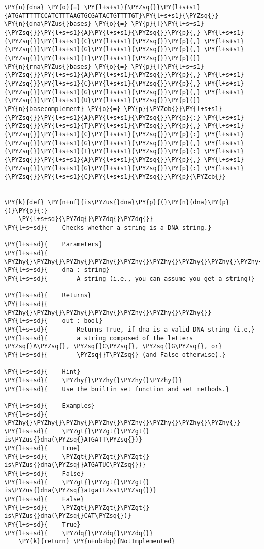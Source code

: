 \begin{Verbatim}[commandchars=\\\{\}]
\PY{n}{dna} \PY{o}{=} \PY{l+s+s1}{\PYZsq{}}\PY{l+s+s1}{ATGATTTTTCCATCTTTAAGTGCGATACTGTTTTGT}\PY{l+s+s1}{\PYZsq{}}
\PY{n}{dna\PYZus{}bases} \PY{o}{=} \PY{p}{[}\PY{l+s+s1}{\PYZsq{}}\PY{l+s+s1}{A}\PY{l+s+s1}{\PYZsq{}}\PY{p}{,} \PY{l+s+s1}{\PYZsq{}}\PY{l+s+s1}{C}\PY{l+s+s1}{\PYZsq{}}\PY{p}{,} \PY{l+s+s1}{\PYZsq{}}\PY{l+s+s1}{G}\PY{l+s+s1}{\PYZsq{}}\PY{p}{,} \PY{l+s+s1}{\PYZsq{}}\PY{l+s+s1}{T}\PY{l+s+s1}{\PYZsq{}}\PY{p}{]}
\PY{n}{rna\PYZus{}bases} \PY{o}{=} \PY{p}{[}\PY{l+s+s1}{\PYZsq{}}\PY{l+s+s1}{A}\PY{l+s+s1}{\PYZsq{}}\PY{p}{,} \PY{l+s+s1}{\PYZsq{}}\PY{l+s+s1}{C}\PY{l+s+s1}{\PYZsq{}}\PY{p}{,} \PY{l+s+s1}{\PYZsq{}}\PY{l+s+s1}{G}\PY{l+s+s1}{\PYZsq{}}\PY{p}{,} \PY{l+s+s1}{\PYZsq{}}\PY{l+s+s1}{U}\PY{l+s+s1}{\PYZsq{}}\PY{p}{]}
\PY{n}{basecomplement} \PY{o}{=} \PY{p}{\PYZob{}}\PY{l+s+s1}{\PYZsq{}}\PY{l+s+s1}{A}\PY{l+s+s1}{\PYZsq{}}\PY{p}{:} \PY{l+s+s1}{\PYZsq{}}\PY{l+s+s1}{T}\PY{l+s+s1}{\PYZsq{}}\PY{p}{,} \PY{l+s+s1}{\PYZsq{}}\PY{l+s+s1}{C}\PY{l+s+s1}{\PYZsq{}}\PY{p}{:} \PY{l+s+s1}{\PYZsq{}}\PY{l+s+s1}{G}\PY{l+s+s1}{\PYZsq{}}\PY{p}{,} \PY{l+s+s1}{\PYZsq{}}\PY{l+s+s1}{T}\PY{l+s+s1}{\PYZsq{}}\PY{p}{:} \PY{l+s+s1}{\PYZsq{}}\PY{l+s+s1}{A}\PY{l+s+s1}{\PYZsq{}}\PY{p}{,} \PY{l+s+s1}{\PYZsq{}}\PY{l+s+s1}{G}\PY{l+s+s1}{\PYZsq{}}\PY{p}{:} \PY{l+s+s1}{\PYZsq{}}\PY{l+s+s1}{C}\PY{l+s+s1}{\PYZsq{}}\PY{p}{\PYZcb{}}


\PY{k}{def} \PY{n+nf}{is\PYZus{}dna}\PY{p}{(}\PY{n}{dna}\PY{p}{)}\PY{p}{:}
    \PY{l+s+sd}{\PYZdq{}\PYZdq{}\PYZdq{}}
\PY{l+s+sd}{    Checks whether a string is a DNA string.}

\PY{l+s+sd}{    Parameters}
\PY{l+s+sd}{    \PYZhy{}\PYZhy{}\PYZhy{}\PYZhy{}\PYZhy{}\PYZhy{}\PYZhy{}\PYZhy{}\PYZhy{}\PYZhy{}}
\PY{l+s+sd}{    dna : string}
\PY{l+s+sd}{        A string (i.e., you can assume you get a string)}

\PY{l+s+sd}{    Returns}
\PY{l+s+sd}{    \PYZhy{}\PYZhy{}\PYZhy{}\PYZhy{}\PYZhy{}\PYZhy{}\PYZhy{}}
\PY{l+s+sd}{    out : bool}
\PY{l+s+sd}{        Returns True, if dna is a valid DNA string (i.e,}
\PY{l+s+sd}{        a string composed of the letters \PYZsq{}A\PYZsq{}, \PYZsq{}C\PYZsq{}, \PYZsq{}G\PYZsq{}, or}
\PY{l+s+sd}{        \PYZsq{}T\PYZsq{} (and False otherwise).}

\PY{l+s+sd}{    Hint}
\PY{l+s+sd}{    \PYZhy{}\PYZhy{}\PYZhy{}\PYZhy{}}
\PY{l+s+sd}{    Use the builtin set function and set methods.}

\PY{l+s+sd}{    Examples}
\PY{l+s+sd}{    \PYZhy{}\PYZhy{}\PYZhy{}\PYZhy{}\PYZhy{}\PYZhy{}\PYZhy{}\PYZhy{}}
\PY{l+s+sd}{    \PYZgt{}\PYZgt{}\PYZgt{} is\PYZus{}dna(\PYZsq{}ATGATT\PYZsq{})}
\PY{l+s+sd}{    True}
\PY{l+s+sd}{    \PYZgt{}\PYZgt{}\PYZgt{} is\PYZus{}dna(\PYZsq{}ATGATUC\PYZsq{})}
\PY{l+s+sd}{    False}
\PY{l+s+sd}{    \PYZgt{}\PYZgt{}\PYZgt{} is\PYZus{}dna(\PYZsq{}atgattZss1\PYZsq{})}
\PY{l+s+sd}{    False}
\PY{l+s+sd}{    \PYZgt{}\PYZgt{}\PYZgt{} is\PYZus{}dna(\PYZsq{}CAT\PYZsq{})}
\PY{l+s+sd}{    True}
\PY{l+s+sd}{    \PYZdq{}\PYZdq{}\PYZdq{}}
    \PY{k}{return} \PY{n+nb+bp}{NotImplemented}
\end{Verbatim}
